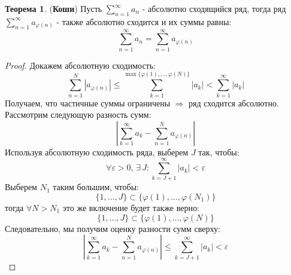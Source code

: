 \documentclass[12pt]{article}
\newcommand{\VE}{\varepsilon}
\theoremstyle{definition}
\newtheorem{theorem}{Теорема}
\begin{document}
\begin{theorem}(\textbf{Коши})
	Пусть $\displaystyle \sum\limits_{n = 1 }^{\infty} a_n$ - абсолютно сходящийся ряд, тогда ряд $\displaystyle \sum\limits_{n = 1 }^{\infty} a_{\varphi(n)}$ - также абсолютно сходится и их суммы равны:
	$$
		\sum\limits_{n = 1 }^{\infty} a_n = \sum\limits_{n = 1 }^{\infty} a_{\varphi(n)}
	$$	
\end{theorem}
\begin{proof}
	Докажем абсолютную сходимость:
	$$
		\sum\limits_{n = 1}^{N} \left|a_{\varphi(n)} \right| \leq \sum\limits_{k = 1}^{\max\{\varphi(1),\dotsc, \varphi(N)\}} \left| a_k \right| < \sum\limits_{k = 1}^{\infty}\left| a_k \right|
	$$
	Получаем, что частичные суммы ограничены $\Rightarrow$ ряд сходится абсолютно. Рассмотрим следующую разность сумм:
	$$
		\left| \sum\limits_{k = 1}^{\infty} a_k - \sum\limits_{n = 1}^{N} a_{\varphi(n)} \right|
	$$
	Используя абсолютную сходимость ряда, выберем $J$ так, чтобы:
	$$
		\forall \VE > 0, \, \exists \, J \colon  \sum\limits_{k = J + 1}^{\infty} \left| a_k \right| < \VE
	$$
	Выберем $N_1$ таким большим, чтобы: 
	$$
		\{1, \dotsc, J\} \subset \{\varphi(1), \dotsc, \varphi(N_1)\}
	$$ 
	тогда $\forall N > N_1$ это же включение будет также верно: 
	$$
		\{1, \dotsc, J\} \subset \{\varphi(1), \dotsc, \varphi(N)\}
	$$
	Следовательно, мы получим оценку разности сумм сверху:
	$$
		\left| \sum\limits_{k = 1}^{\infty} a_k - \sum\limits_{n = 1}^{N} a_{\varphi(n)} \right| \leq  \sum\limits_{k = J + 1}^{\infty} \left| a_k \right| < \VE
	$$
\end{proof}
\end{document}
